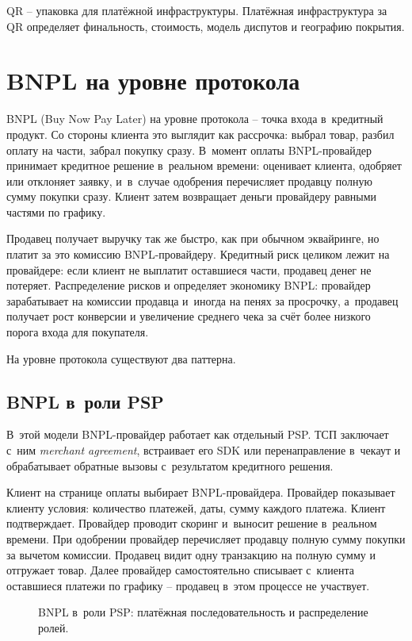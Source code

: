 QR -- упаковка для платёжной инфраструктуры. Платёжная инфраструктура за QR определяет
финальность, стоимость, модель диспутов и географию покрытия.

\section{BNPL на уровне протокола}\label{sec:alt-bnpl}

BNPL (Buy Now Pay Later) на уровне протокола -- точка входа
в~кредитный продукт. Со стороны клиента это выглядит как рассрочка:
выбрал товар, разбил оплату на части, забрал покупку сразу. В~момент
оплаты BNPL-провайдер принимает кредитное решение в~реальном времени:
оценивает клиента, одобряет или отклоняет заявку, и~в~случае
одобрения перечисляет продавцу полную сумму покупки сразу. Клиент
затем возвращает деньги провайдеру равными частями по графику.

Продавец получает выручку так же быстро, как при обычном эквайринге,
но платит за это комиссию BNPL-провайдеру. Кредитный риск целиком
лежит на провайдере: если клиент не выплатит оставшиеся части,
продавец денег не потеряет. Распределение рисков и определяет
экономику BNPL: провайдер зарабатывает на комиссии продавца
и~иногда на пенях за просрочку, а~продавец получает рост конверсии
и увеличение среднего чека за счёт более низкого порога входа
для покупателя.

На уровне протокола существуют два паттерна.

\subsection*{BNPL в~роли PSP}

В~этой модели BNPL-провайдер работает как отдельный PSP. ТСП
заключает с~ним \textit{merchant agreement}, встраивает его SDK или
перенаправление в~чекаут и обрабатывает обратные вызовы с~результатом
кредитного решения.

Клиент на странице оплаты выбирает
BNPL-провайдера. Провайдер показывает клиенту условия: количество
платежей, даты, сумму каждого платежа. Клиент подтверждает. Провайдер
проводит скоринг и~выносит решение в~реальном времени. При одобрении
провайдер перечисляет продавцу полную сумму покупки за вычетом комиссии.
Продавец видит одну транзакцию на полную сумму и отгружает товар.
Далее провайдер самостоятельно списывает с~клиента оставшиеся
платежи по графику -- продавец в~этом процессе не участвует.

\begin{figure}[tbp]
  \centering
  \caption{BNPL в~роли PSP: платёжная последовательность и распределение ролей.}\label{fig:bnpl-psp-flow}
\end{figure}

